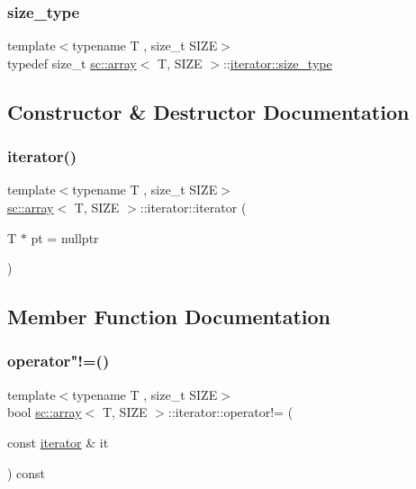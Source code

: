 \subsubsection{\texorpdfstring{size\+\_\+type}{size\_type}}
{\footnotesize\ttfamily template$<$typename T , size\+\_\+t S\+I\+ZE$>$ \\
typedef size\+\_\+t \hyperlink{classsc_1_1array}{sc\+::array}$<$ T, S\+I\+ZE $>$\+::\hyperlink{classsc_1_1array_1_1iterator_aeec0cf52de962a18d79cdbcdfe74be92}{iterator\+::size\+\_\+type}}



\subsection{Constructor \& Destructor Documentation}
\mbox{\label{classsc_1_1array_1_1iterator_a92c82b17f5fef34bb3530fa95887c5da}} 
\subsubsection{\texorpdfstring{iterator()}{iterator()}}
{\footnotesize\ttfamily template$<$typename T , size\+\_\+t S\+I\+ZE$>$ \\
\hyperlink{classsc_1_1array}{sc\+::array}$<$ T, S\+I\+ZE $>$\+::iterator\+::iterator (\begin{DoxyParamCaption}\item[{T $\ast$}]{pt = {\ttfamily nullptr} }\end{DoxyParamCaption})\hspace{0.3cm}{\ttfamily [inline]}}



\subsection{Member Function Documentation}
\mbox{\label{classsc_1_1array_1_1iterator_ac84816f86bbbe67a5a0951dba2668538}} 
\subsubsection{\texorpdfstring{operator"!=()}{operator!=()}}
{\footnotesize\ttfamily template$<$typename T , size\+\_\+t S\+I\+ZE$>$ \\
bool \hyperlink{classsc_1_1array}{sc\+::array}$<$ T, S\+I\+ZE $>$\+::iterator\+::operator!= (\begin{DoxyParamCaption}\item[{const \hyperlink{classsc_1_1array_1_1iterator}{iterator} \&}]{it }\end{DoxyParamCaption}) const\hspace{0.3cm}{\ttfamily [inline]}}



